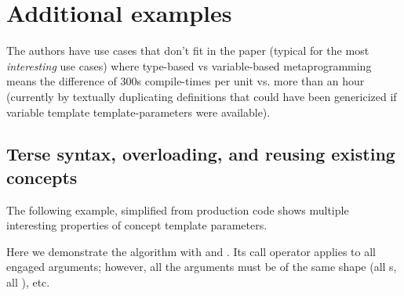 \documentclass{wg21}
\begin{document}
\section{Additional examples}

The authors have use cases that don't fit in the paper (typical for the most \emph{interesting} use cases) where type-based vs variable-based metaprogramming means the difference of 300s compile-times per unit vs. more than an hour (currently by textually duplicating definitions that could have been genericized if variable template template-parameters were available).

%
%
%
%
%
%
%
%
%
%

\pagebreak

\subsection{Terse syntax, overloading, and reusing existing concepts}

The following example, simplified from production code shows multiple interesting properties of concept template parameters.

Here we demonstrate the algorithm  with  and .
Its call operator applies  to all engaged arguments; however, all the arguments must be of the same shape (all s, all ), etc.
\end{document}
